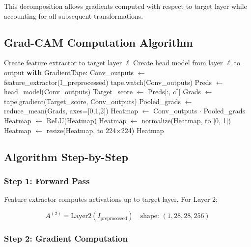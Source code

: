 \documentclass[12pt,a4paper,oneside]{book}
\begin{document}
This decomposition allows gradients computed with respect to target layer while accounting for all subsequent transformations.

\subsection{Grad-CAM Computation Algorithm}

\begin{algorithm}[H]
\caption{Single-Layer Grad-CAM Computation}
\begin{algorithmic}[1]
  \State Create feature extractor to target layer $\ell$
  \State Create head model from layer $\ell$ to output
  \State
  \State \textbf{with} GradientTape:
  \State \quad Conv\_outputs $\gets$ feature\_extractor(I\_preprocessed)
  \State \quad tape.watch(Conv\_outputs)
  \State \quad Preds $\gets$ head\_model(Conv\_outputs)
  \State \quad Target\_score $\gets$ Preds[:, $c^*$]
  \State
  \State Grads $\gets$ tape.gradient(Target\_score, Conv\_outputs)
  \State Pooled\_grads $\gets$ reduce\_mean(Grads, axes=[0,1,2])
  \State
  \State Heatmap $\gets$ Conv\_outputs $\cdot$ Pooled\_grads
  \State Heatmap $\gets$ ReLU(Heatmap)
  \State Heatmap $\gets$ normalize(Heatmap, to [0, 1])
  \State Heatmap $\gets$ resize(Heatmap, to 224×224)
  \State
  \Return Heatmap
\EndProcedure
\end{algorithmic}
\end{algorithm}

\subsection{Algorithm Step-by-Step}

\subsubsection{Step 1: Forward Pass}

Feature extractor computes activations up to target layer. For Layer 2:

\begin{equation}
A^{(2)} = \text{Layer2}(I_{\text{preprocessed}}) \quad \text{shape: } (1, 28, 28, 256)
\end{equation}

\subsubsection{Step 2: Gradient Computation}
\end{document}
